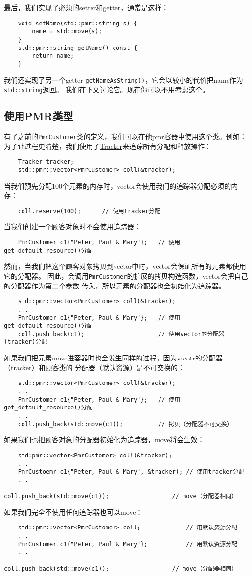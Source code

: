 最后，我们实现了必须的setter和getter，通常是这样：
\begin{lstlisting}
    void setName(std::pmr::string s) {
        name = std::move(s);
    }
    std::pmr::string getName() const {
        return name;
    }
\end{lstlisting}
我们还实现了另一个getter \texttt{getNameAsString()}，它会以较小的代价把name作为\texttt{std::string}返回。
我们\hyperref[pmr转换]{在下文讨论它}。现在你可以不用考虑这个。

\subsection{使用PMR类型}
有了之前的\texttt{PmrCustomer}类的定义，我们可以在他pmr容器中使用这个类。例如：
为了让过程更清楚，我们使用了\hyperref[ch29.2]{Tracker}来追踪所有分配和释放操作：
\begin{lstlisting}
    Tracker tracker;
    std::pmr::vector<PmrCustomer> coll(&tracker);
\end{lstlisting}
当我们预先分配100个元素的内存时，vector会使用我们的追踪器分配必须的内存：
\begin{lstlisting}
    coll.reserve(100);      // 使用tracker分配
\end{lstlisting}
当我们创建一个顾客对象时不会使用追踪器：
\begin{lstlisting}
    PmrCustomer c1{"Peter, Paul & Mary"};   // 使用get_default_resource()分配
\end{lstlisting}
然而，当我们把这个顾客对象拷贝到vector中时，vector会保证所有的元素都使用它的分配器。
因此，会调用\texttt{PmrCustomer}的扩展的拷贝构造函数，vector会把自己的分配器作为第二个参数
传入，所以元素的分配器也会初始化为追踪器。
\begin{lstlisting}
    std::pmr::vector<PmrCustomer> coll(&tracker);
    ...
    PmrCustomer c1{"Peter, Paul & Mary"};   // 使用get_default_resource()分配
    coll.push_back(c1);                     // 使用vector的分配器(tracker)分配
\end{lstlisting}
如果我们把元素move进容器时也会发生同样的过程，因为vecotr的分配器（tracker）和顾客类的
分配器（默认资源）是不可交换的：
\begin{lstlisting}
    std::pmr::vector<PmrCustomer> coll(&tracker);
    ...
    PmrCustomer c1{"Peter, Paul & Mary"};   // 使用get_default_resource()分配
    ...
    coll.push_back(std::move(c1));          // 拷贝（分配器不可交换）
\end{lstlisting}
如果我们也把顾客对象的分配器初始化为追踪器，move将会生效：
\begin{lstlisting}
    std:pmr::vector<PmrCustomer> coll(&tracker);
    ...
    PmrCustoemr c1{"Peter, Paul & Mary", &tracker); // 使用tracker分配
    ...
    coll.push_back(std::move(c1));                  // move（分配器相同）
\end{lstlisting}
如果我们完全不使用任何追踪器也可以move：
\begin{lstlisting}
    std::pmr::vector<PmrCustomer> coll;             // 用默认资源分配
    ...
    PmrCustomer c1{"Peter, Paul & Mary"};           // 用默认资源分配
    ...
    coll.push_back(std::move(c1));                  // move（分配器相同）
\end{lstlisting}

